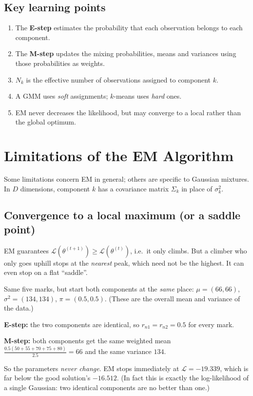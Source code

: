 \documentclass[11pt,a4paper]{article}
\newcommand{\LL}{\mathcal{L}}
\begin{document}
\subsection{Key learning points}
\begin{enumerate}[nosep]
\item The \textbf{E-step} estimates the probability that each observation belongs to each component.
\item The \textbf{M-step} updates the mixing probabilities, means and variances using those probabilities as weights.
\item $N_k$ is the effective number of observations assigned to component $k$.
\item A GMM uses \emph{soft} assignments; $k$-means uses \emph{hard} ones.
\item EM never decreases the likelihood, but may converge to a local rather than the global optimum.
\end{enumerate}

\section{Limitations of the EM Algorithm}

Some limitations concern EM in general; others are specific to Gaussian mixtures. In $D$ dimensions, component $k$ has a covariance matrix $\Sigma_k$ in place of $\sigma_k^2$.

\subsection{Convergence to a local maximum (or a saddle point)}

EM guarantees $\LL(\theta^{(t+1)})\ge\LL(\theta^{(t)})$, i.e.\ it only climbs. But a climber who only goes uphill stops at the \emph{nearest} peak, which need not be the highest. It can even stop on a flat ``saddle''.

\begin{example}
Same five marks, but start both components at the \emph{same} place: $\mu=(66,66)$, $\sigma^2=(134,134)$, $\pi=(0.5,0.5)$. (These are the overall mean and variance of the data.)

\textbf{E-step:} the two components are identical, so $r_{n1}=r_{n2}=0.5$ for every mark.

\textbf{M-step:} both components get the same weighted mean $\frac{0.5(50+55+70+75+80)}{2.5}=66$ and the same variance $134$.

So the parameters \emph{never change}. EM stops immediately at $\LL=-19.339$, which is far below the good solution's $-16.512$. (In fact this is exactly the log-likelihood of a single Gaussian: two identical components are no better than one.)
\end{example}
\end{document}
